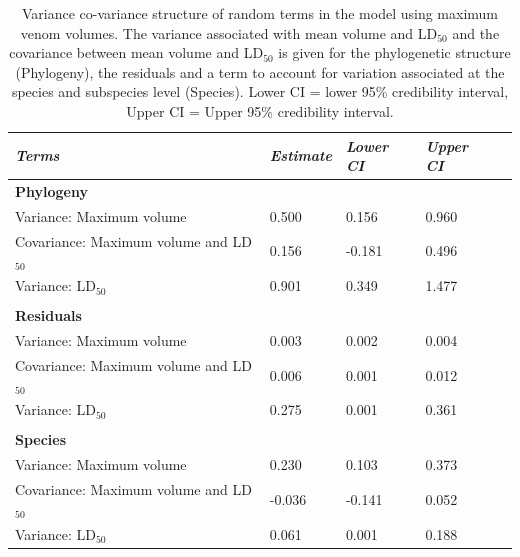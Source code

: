 \begin{table}[H]
  \centering
    \caption[ ]{Variance co-variance structure of random terms in the model using maximum venom volumes. The variance associated with mean volume and LD$_{50}$ and the covariance between mean volume and LD$_{50}$ is given for the phylogenetic structure (Phylogeny), the residuals and a term to account for variation associated at the species and subspecies level (Species). Lower CI = lower 95\% credibility interval, Upper CI = Upper 95\% credibility interval.}
\begin{tabular}{*5l}    \toprule
\emph{Terms} & \emph{Estimate} & \emph{Lower CI} & \emph{Upper CI}\\\midrule
\textbf{Phylogeny} &   &   &  \\ 
Variance: Maximum volume & 0.500 & 0.156 & 0.960 \\
Covariance: Maximum volume and LD$_{50}$ & 0.156  &  -0.181  & 0.496 \\
Variance: LD$_{50}$ & 0.901 & 0.349 & 1.477 \\

 &   &   &  \\

\textbf{Residuals} &   &   &  \\ 
Variance: Maximum volume & 0.003 & 0.002 & 0.004 \\
Covariance: Maximum volume and LD$_{50}$ & 0.006  & 0.001  & 0.012 \\
Variance: LD$_{50}$ & 0.275 & 0.001 & 0.361 \\

 &   &   &  \\ 

\textbf{Species} &   &   &  \\ 
Variance: Maximum volume & 0.230 & 0.103 & 0.373 \\
Covariance: Maximum volume and LD$_{50}$ &  -0.036  &  -0.141  & 0.052 \\
Variance: LD$_{50}$ & 0.061 & 0.001 & 0.188 \\\bottomrule
 \hline
\end{tabular}
  \label{tbl:Table 4.4.}
\end{table}


